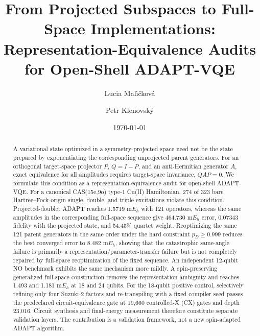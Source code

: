 \documentclass[
 aip,
 jcp,
 amsmath,amssymb,
 preprint
]{revtex4-2}
\begin{document}
\title{From Projected Subspaces to Full-Space Implementations:
Representation-Equivalence Audits for Open-Shell ADAPT-VQE}

\author{Lucia Mal\'{\i}\v{c}kov\'a}

\author{Petr Klenovsk\'y}

\date{\today}

\begin{abstract}
A variational state optimized in a symmetry-projected space need not be the state prepared by exponentiating the corresponding unprojected parent generators.
For an orthogonal target-space projector $P$, $Q=I-P$, and an anti-Hermitian generator $A$, exact equivalence for all amplitudes requires target-space invariance, $QAP=0$.
We formulate this condition as a representation-equivalence audit for open-shell ADAPT-VQE.
For a canonical CAS(15e,9o) type-1 Cu(II) Hamiltonian, 274 of 323 bare Hartree--Fock-origin single, double, and triple excitations violate this condition.
Projected-doublet ADAPT reaches 1.5719 m$E_h$ with 121 operators, whereas the same amplitudes in the corresponding full-space sequence give 464.730 m$E_h$ error, 0.07343 fidelity with the projected state, and 54.45\% quartet weight.
Reoptimizing the same 121 parent generators in the same order under the hard constraint $p_D\ge0.999$ reduces the best converged error to 8.482 m$E_h$, showing that the catastrophic same-angle failure is primarily a representation/parameter-transfer failure but is not completely repaired by full-space reoptimization of the fixed sequence.
An independent 12-qubit NO benchmark exhibits the same mechanism more mildly.
A spin-preserving generalized full-space construction removes the representation ambiguity and reaches 1.493 and 1.181 m$E_h$ at 18 and 24 qubits.
For the 18-qubit positive control, selectively refining only four Suzuki-2 factors and re-transpiling with a fixed compiler seed passes the predeclared circuit-equivalence gate at 19,660 controlled-X (CX) gates and depth 23,016.
Circuit synthesis and final-energy measurement therefore constitute separate validation layers.
The contribution is a validation framework, not a new spin-adapted ADAPT algorithm.
\end{abstract}
\end{document}
